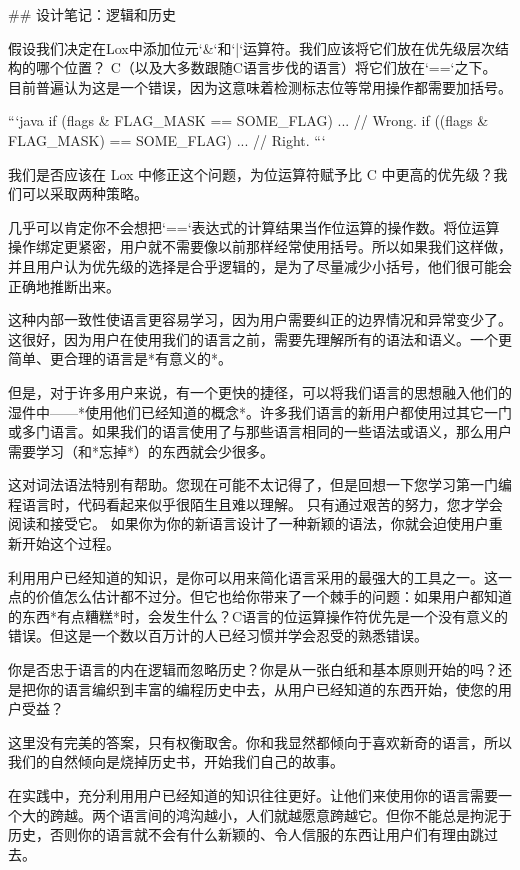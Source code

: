 \documentclass[cn,11pt,chinese]{elegantbook}
\begin{document}
## 设计笔记：逻辑和历史

假设我们决定在Lox中添加位元`&`和`|`运算符。我们应该将它们放在优先级层次结构的哪个位置？ C（以及大多数跟随C语言步伐的语言）将它们放在`==`之下。 目前普遍认为这是一个错误，因为这意味着检测标志位等常用操作都需要加括号。

```java
if (flags & FLAG_MASK == SOME_FLAG) { ... } // Wrong.
if ((flags & FLAG_MASK) == SOME_FLAG) { ... } // Right.
```

我们是否应该在 Lox 中修正这个问题，为位运算符赋予比 C 中更高的优先级？我们可以采取两种策略。

几乎可以肯定你不会想把`==`表达式的计算结果当作位运算的操作数。将位运算操作绑定更紧密，用户就不需要像以前那样经常使用括号。所以如果我们这样做，并且用户认为优先级的选择是合乎逻辑的，是为了尽量减少小括号，他们很可能会正确地推断出来。

这种内部一致性使语言更容易学习，因为用户需要纠正的边界情况和异常变少了。这很好，因为用户在使用我们的语言之前，需要先理解所有的语法和语义。一个更简单、更合理的语言是*有意义的*。

但是，对于许多用户来说，有一个更快的捷径，可以将我们语言的思想融入他们的湿件中——*使用他们已经知道的概念*。许多我们语言的新用户都使用过其它一门或多门语言。如果我们的语言使用了与那些语言相同的一些语法或语义，那么用户需要学习（和*忘掉*）的东西就会少很多。

这对词法语法特别有帮助。您现在可能不太记得了，但是回想一下您学习第一门编程语言时，代码看起来似乎很陌生且难以理解。 只有通过艰苦的努力，您才学会阅读和接受它。 如果你为你的新语言设计了一种新颖的语法，你就会迫使用户重新开始这个过程。

利用用户已经知道的知识，是你可以用来简化语言采用的最强大的工具之一。这一点的价值怎么估计都不过分。但它也给你带来了一个棘手的问题：如果用户都知道的东西*有点糟糕*时，会发生什么？C语言的位运算操作符优先是一个没有意义的错误。但这是一个数以百万计的人已经习惯并学会忍受的熟悉错误。

你是否忠于语言的内在逻辑而忽略历史？你是从一张白纸和基本原则开始的吗？还是把你的语言编织到丰富的编程历史中去，从用户已经知道的东西开始，使您的用户受益？

这里没有完美的答案，只有权衡取舍。你和我显然都倾向于喜欢新奇的语言，所以我们的自然倾向是烧掉历史书，开始我们自己的故事。

在实践中，充分利用用户已经知道的知识往往更好。让他们来使用你的语言需要一个大的跨越。两个语言间的鸿沟越小，人们就越愿意跨越它。但你不能总是拘泥于历史，否则你的语言就不会有什么新颖的、令人信服的东西让用户们有理由跳过去。
\end{document}
